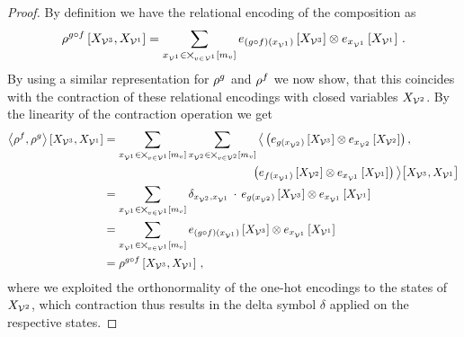 \begin{proof}
    By definition we have the relational encoding of the composition as
    \begin{align*}
        \rho^{{g}\circ{f}}\left[X_{\mathcal{V}^{3}},X_{\mathcal{V}^{1}}\right]
        = \sum_{x_{\mathcal{V}^{1}}\in\bigtimes_{v\in\mathcal{V}^{1}}[m_{v}]}
        e_{({g}\circ{f})(x_{\mathcal{V}^{1}})}\left[X_{\mathcal{V}^{3}}\right] \otimes
        e_{x_{\mathcal{V}^{1}}}\left[X_{\mathcal{V}^{1}}\right]  \, .
    \end{align*}
    By using a similar representation for $\rho^{g}$ and $\rho^{f}$ we now show, that this coincides with the contraction of these relational encodings with closed variables $X_{\mathcal{V}^{2}}$.
    By the linearity of the contraction operation we get
    \begin{align*}
        \contractionof{\rencodingof{\exfunction},\rencodingof{\secexfunction}}{\catvariableof{\nodesthree},\catvariableof{\nodesone}}
        & = \sum_{\catindexof{\nodesone}\in\bigtimes_{\node\in\nodesone}[\catdimof{\node}]}
        \sum_{\catindexof{\nodestwo} \in \bigtimes_{\node\in\nodestwo}[\catdimof{\node}]}
        \breakablecontractionof{
            \left( \onehotmapofat{\secexfunctionat{\catindexof{\nodestwo}}}{\catvariableof{\nodesthree}} \otimes
            \onehotmapofat{\catindexof{\nodestwo}}{\catvariableof{\nodestwo}} \right), \\
            & \hspace{4.5cm} \left( \onehotmapofat{\exfunctionat{\catindexof{\nodesone}}}{\catvariableof{\nodestwo}} \otimes
            \onehotmapofat{\catindexof{\nodesone}}{\catvariableof{\nodesone}} \right)
        }{\catvariableof{\nodesthree},\catvariableof{\nodesone}} \\
        & = \sum_{\catindexof{\nodesone}\in\bigtimes_{\node\in\nodesone}[\catdimof{\node}]}
        \delta_{\catindexof{\nodestwo},\catindexof{\nodesone}} \, \cdot \,
        \onehotmapofat{\secexfunctionat{\catindexof{\nodestwo}}}{\catvariableof{\nodesthree}} \otimes
        \onehotmapofat{\catindexof{\nodesone}}{\catvariableof{\nodesone}} \\
        & = \sum_{\catindexof{\nodesone}\in\nodestatesof{\nodesone}}
        \onehotmapofat{\compositionofat{\secexfunction}{\exfunction}{\catindexof{\nodesone}}}{\catvariableof{\nodesthree}} \otimes
        \onehotmapofat{\catindexof{\nodesone}}{\catvariableof{\nodesone}} \\
        & = \rencodingofat{\compositionof{\secexfunction}{\exfunction}}{\catvariableof{\nodesthree},\catvariableof{\nodesone}} \, ,
    \end{align*}
    where we exploited the orthonormality of the one-hot encodings to the states of $X_{\mathcal{V}^{2}}$, which contraction thus results in the delta symbol $\delta$ applied on the respective states.
\end{proof}

